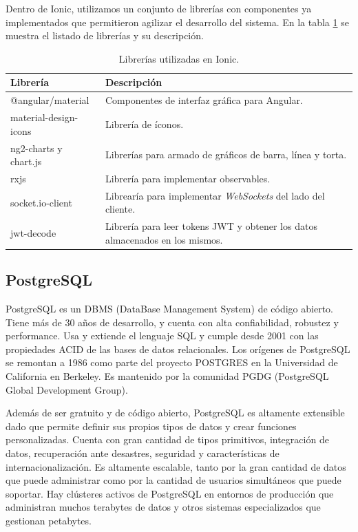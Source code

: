 Dentro de Ionic, utilizamos un conjunto de librerías con componentes ya implementados que permitieron agilizar el desarrollo del sistema. En la tabla \ref{tab:ioniclibrerias} se muestra el listado de librerías y su descripción.

\begin{table}[h]
	\centering
	\caption[Librerías Ionic ]{Librerías utilizadas en Ionic.}
	\begin{tabular}{p{4cm} p{8.5cm} } 	

		\toprule
		\textbf{Librería} & 
		\textbf{Descripción}
		\\
		\midrule
@angular/material & Componentes de interfaz gráfica para Angular. \\
material-design-icons & Librería de íconos. \\
ng2-charts y chart.js & Librerías para armado de gráficos de barra, línea y torta. \\
rxjs & Librería para implementar observables. \\
socket.io-client & Librearía para implementar \textit{WebSockets} del lado del cliente. \\
jwt-decode & Librería para leer tokens JWT y obtener los datos almacenados en los mismos. \\
		\bottomrule
		\hline
	\end{tabular}
	\label{tab:ioniclibrerias}
\end{table}

\pagebreak
\subsection{PostgreSQL}

PostgreSQL es un DBMS (DataBase Management System) de código abierto. Tiene más de 30 años de desarrollo, y cuenta con alta confiabilidad, robustez y performance. Usa y extiende el lenguaje SQL y cumple desde 2001 con las propiedades ACID de las bases de datos relacionales. Los orígenes de PostgreSQL se remontan a 1986 como parte del proyecto POSTGRES en la Universidad de California en Berkeley. Es mantenido por la comunidad PGDG (PostgreSQL Global Development Group).

Además de ser gratuito y de código abierto, PostgreSQL es altamente extensible dado que permite definir sus propios tipos de datos y crear funciones personalizadas. Cuenta con gran cantidad de tipos primitivos, integración de datos, recuperación ante desastres, seguridad y características de internacionalización. Es altamente escalable, tanto por la gran cantidad de datos que puede administrar como por la cantidad de usuarios simultáneos que puede soportar. Hay clústeres activos de PostgreSQL en entornos de producción que administran muchos terabytes de datos y otros sistemas especializados que gestionan petabytes.

